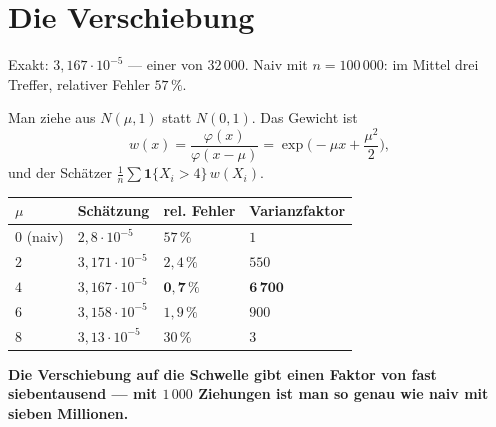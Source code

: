 \section{Die Verschiebung}

\begin{merksatz}
Exakt: $3{,}167\cdot10^{-5}$ --- einer von $32\,000$. Naiv mit $n = 100\,000$: im Mittel drei Treffer, relativer Fehler $57\,\%$.

Man ziehe aus $N(\mu,1)$ statt $N(0,1)$. Das Gewicht ist
\[ w(x) = \frac{\varphi(x)}{\varphi(x-\mu)} = \exp\!\Big(-\mu x + \frac{\mu^2}{2}\Big) , \]
und der Schätzer $\frac1n\sum \mathbf 1\{X_i>4\}\,w(X_i)$.

\begin{center}
{\small
\renewcommand{\arraystretch}{1.48}
\begin{tabular}{@{}P{1.6cm}P{2.4cm}P{2.4cm}P{2.6cm}@{}}
\toprule
$\mu$ & \textbf{Schätzung} & \textbf{rel. Fehler} & \textbf{Varianzfaktor}\\
\midrule
$0$ (naiv) & $2{,}8\cdot10^{-5}$ & $57\,\%$ & $1$\\
$2$ & $3{,}171\cdot10^{-5}$ & $2{,}4\,\%$ & $550$\\
$4$ & $3{,}167\cdot10^{-5}$ & $\mathbf{0{,}7\,\%}$ & $\mathbf{6\,700}$\\
$6$ & $3{,}158\cdot10^{-5}$ & $1{,}9\,\%$ & $900$\\
$8$ & $3{,}13\cdot10^{-5}$ & $30\,\%$ & $3$\\
\bottomrule
\end{tabular}}
\end{center}

\begin{center}
\begin{minipage}{0.9\textwidth}
\textbf{Die Verschiebung auf die Schwelle gibt einen Faktor von fast siebentausend --- mit $1\,000$ Ziehungen ist man so genau wie naiv mit sieben Millionen.}
\end{minipage}
\end{center}

\begin{center}
\begin{minipage}{0.88\textwidth}
\end{minipage}
\end{center}
\end{merksatz}

